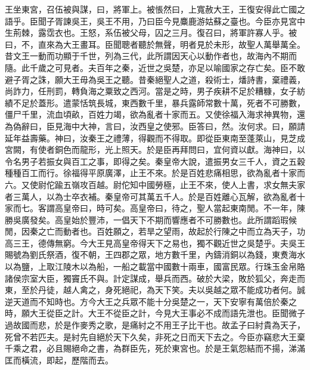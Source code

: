 王坐東宮，召伍被與謀，曰，將軍上。被悵然曰，上寬赦大王，王復安得此亡國之語乎。臣聞子胥諫吳王，吳王不用，乃曰臣今見麋鹿游姑蘇之臺也。今臣亦見宮中生荊棘，露霑衣也。王怒，系伍被父母，囚之三月。復召曰，將軍許寡人乎。被曰，不，直來為大王畫耳。臣聞聰者聽於無聲，明者見於未形，故聖人萬舉萬全。昔文王一動而功顯于千世，列為三代，此所謂因天心以動作者也，故海內不期而隨。此千歲之可見者。夫百年之秦，近世之吳楚，亦足以喻國家之存亡矣。臣不敢避子胥之誅，願大王毋為吳王之聽。昔秦絕聖人之道，殺術士，燔詩書，棄禮義，尚詐力，任刑罰，轉負海之粟致之西河。當是之時，男子疾耕不足於糟糠，女子紡績不足於蓋形。遣蒙恬筑長城，東西數千里，暴兵露師常數十萬，死者不可勝數，僵尸千里，流血頃畝，百姓力竭，欲為亂者十家而五。又使徐福入海求神異物，還為偽辭曰，臣見海中大神，言曰，汝西皇之使邪。臣答曰，然。汝何求。曰，願請延年益壽藥。神曰，汝秦王之禮薄，得觀而不得取。即從臣東南至蓬萊山，見芝成宮闕，有使者銅色而龍形，光上照天。於是臣再拜問曰，宜何資以獻。海神曰，以令名男子若振女與百工之事，即得之矣。秦皇帝大說，遣振男女三千人，資之五穀種種百工而行。徐福得平原廣澤，止王不來。於是百姓悲痛相思，欲為亂者十家而六。又使尉佗踰五嶺攻百越。尉佗知中國勞極，止王不來，使人上書，求女無夫家者三萬人，以為士卒衣補。秦皇帝可其萬五千人。於是百姓離心瓦解，欲為亂者十家而七。客謂高皇帝曰，時可矣。高皇帝曰，待之，聖人當起東南閒。不一年，陳勝吳廣發矣。高皇始於豐沛，一倡天下不期而響應者不可勝數也。此所謂蹈瑕候閒，因秦之亡而動者也。百姓願之，若旱之望雨，故起於行陳之中而立為天子，功高三王，德傳無窮。今大王見高皇帝得天下之易也，獨不觀近世之吳楚乎。夫吳王賜號為劉氏祭酒，復不朝，王四郡之眾，地方數千里，內鑄消銅以為錢，東煑海水以為鹽，上取江陵木以為船，一船之載當中國數十兩車，國富民眾。行珠玉金帛賂諸侯宗室大臣，獨竇氏不與。計定謀成，舉兵而西。破於大梁，敗於狐父，奔走而東，至於丹徒，越人禽之，身死絕祀，為天下笑。夫以吳越之眾不能成功者何。誠逆天道而不知時也。方今大王之兵眾不能十分吳楚之一，天下安寧有萬倍於秦之時，願大王從臣之計。大王不從臣之計，今見大王事必不成而語先泄也。臣聞微子過故國而悲，於是作麥秀之歌，是痛紂之不用王子比干也。故孟子曰紂貴為天子，死曾不若匹夫。是紂先自絕於天下久矣，非死之日而天下去之。今臣亦竊悲大王棄千乘之君，必且賜絕命之書，為群臣先，死於東宮也。於是王氣怨結而不揚，涕滿匡而橫流，即起，歷階而去。

